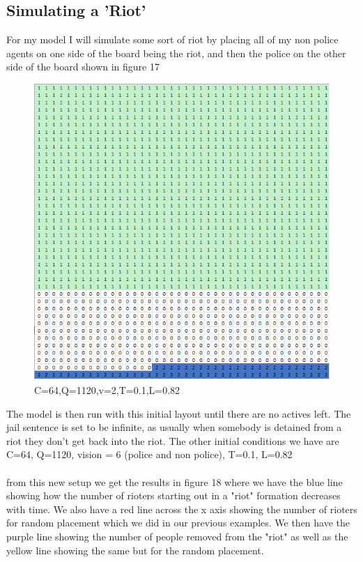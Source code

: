 \documentclass[11pt]{article}
\begin{document}
	\subsection{Simulating a 'Riot'}
	For my model I will simulate some sort of riot by placing all of my non police agents on one side of the board being the riot, and then the police on the other side of the board shown in figure 17
	\begin{figure}[H]
		\includegraphics[width=\linewidth]{Riot Layout.png}
		\caption{C=64,Q=1120,v=2,T=0.1,L=0.82}
		\label{fig:frenchriot}
	\end{figure}
	The model is then run with this initial layout until there are no actives left. The jail sentence is set to be infinite, as usually when somebody is detained from a riot they don't get back into the riot. The other initial conditions we have are C=64, Q=1120, vision = 6 (police and non police), T=0.1, L=0.82\\
	\\
	from this new setup we get the results in figure 18 where we have the blue line showing how the number of rioters starting out in a "riot" formation decreases with time. We also have a red line across the x axis showing the number of rioters for random placement which we did in our previous examples. We then have the purple line showing the number of people removed from the "riot" as well as the yellow line showing the same but for the random placement.\\
\end{document}
